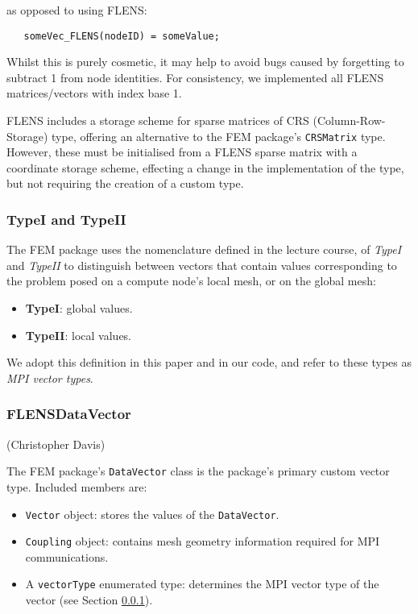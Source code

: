 as opposed to using FLENS:

\begin{lstlisting}
   someVec_FLENS(nodeID) = someValue;
\end{lstlisting}

Whilst this is purely cosmetic, it may help to avoid bugs caused by forgetting to subtract 1 from node identities. For consistency, we implemented all FLENS matrices/vectors with index base 1.

FLENS includes a storage scheme for sparse matrices of CRS (Column-Row-Storage) type, offering an alternative to the FEM package's \texttt{CRSMatrix} type. However, these must be initialised from a FLENS sparse matrix with a coordinate storage scheme, effecting a change in the implementation of the type, but not requiring the creation of a custom type.

\subsubsection{TypeI and TypeII}\label{subsc:typeI_II}

The FEM package uses the nomenclature defined in the lecture course, of \emph{TypeI} and \emph{TypeII} to distinguish between vectors that contain values corresponding to the problem posed on a compute node's local mesh, or on the global mesh:

\begin {itemize}
   \item \textbf{TypeI}: global values.
   \item \textbf{TypeII}: local values.
\end{itemize}

We adopt this definition in this paper and in our code, and refer to these types as \emph{MPI vector types}.

\subsubsection{FLENSDataVector} (Christopher Davis)

The FEM package's \texttt{DataVector} class is the package's primary custom vector type. Included members are:
\begin{itemize}
   \item \texttt{Vector} object: stores the values of the \texttt{DataVector}.
   \item \texttt{Coupling} object: contains mesh geometry information required for MPI communications.
   \item A \texttt{vectorType} enumerated type: determines the MPI vector type of the vector (see Section \ref{subsc:typeI_II}).
\end{itemize}


